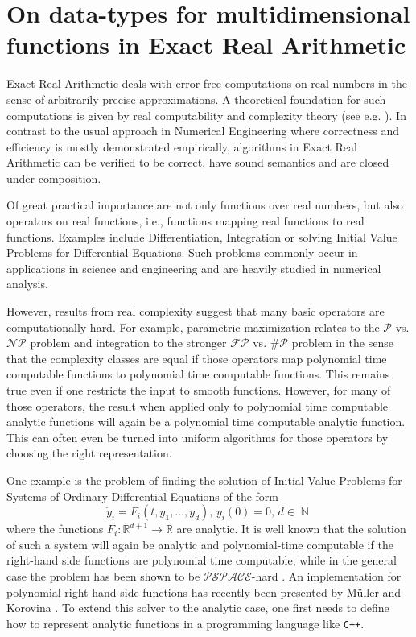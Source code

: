 \documentclass{article}
\newcommand{\RR}{\mathbb R}
\DeclareMathOperator{\NN}{\mathbb N}
\newcommand{\p}{\ensuremath{\mathcal P}\xspace}
\newcommand{\np}{\ensuremath{\mathcal{NP}}\xspace}
\newcommand{\fp}{\ensuremath{\mathcal{FP}}\xspace}
\newcommand{\sharpp}{\ensuremath{\# \mathcal{P}}\xspace}
\newcommand{\pspace}{\ensuremath{ \mathcal{PSPACE}}\xspace}
\newcommand{\cc}{\texttt{C++}\xspace}
\begin{document}
\section*{On data-types for multidimensional functions in Exact Real Arithmetic}
Exact Real Arithmetic deals with error free computations on real numbers in the sense of arbitrarily precise approximations. 
A theoretical foundation for such computations is given by real computability and complexity theory (see e.g. \cite{MR0089809, MR1137517,Weihrauch}).
In contrast to the usual approach in Numerical Engineering where correctness and efficiency is mostly demonstrated empirically, algorithms in Exact Real Arithmetic can be verified to be correct, have sound semantics and are closed under composition.


Of great practical importance are not only functions over real numbers, but also operators on real functions, i.e., functions mapping real functions to real functions.
Examples include Differentiation, Integration or solving Initial Value Problems for Differential Equations.
Such problems commonly occur in applications in science and engineering and are heavily studied in numerical analysis.

However, results from real complexity suggest that many basic operators are computationally hard. 
For example, parametric maximization relates to the $\p$ vs. $\np$ problem \cite{MR666209} and integration to the stronger $\fp$ vs. $\sharpp$ problem \cite{MR748898} in the sense that the complexity classes are equal if those operators map polynomial time computable functions to polynomial time computable functions.
This remains true even if one restricts the input to smooth functions.
However, for many of those operators, the result when applied only to polynomial time computable analytic functions will again be a polynomial time computable analytic function.
This can often even be turned into uniform algorithms for those operators by choosing the right representation.

One example is the problem of finding the solution of Initial Value Problems for Systems of Ordinary Differential Equations of the form 
$$ \dot y_i = F_i(t, y_1, \dots, y_d),\,y_i(0)=0,\, d \in \NN$$
where the functions $F_i : \RR^{d+1} \to \RR$ are analytic.
It is well known that the solution of such a system will again be analytic and polynomial-time computable if the right-hand side functions are polynomial time computable, while in the general case the problem has been shown to be \pspace-hard \cite{Kawamura10}.
An implementation for polynomial right-hand side functions has recently been presented by M\"{u}ller and Korovina \cite{DBLP:journals/corr/abs-1006-0401}.
To extend this solver to the analytic case, one first needs to define how to represent analytic functions in a programming language like \cc.
\end{document}

